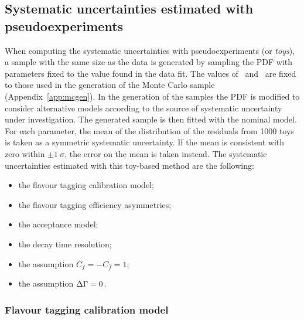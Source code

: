 \subsection{Systematic uncertainties estimated with pseudoexperiments}
\label{sec:systFromToys}

When computing the systematic uncertainties with pseudoexperiments (or \emph{toys}), a sample with the same size as the data is generated by sampling the PDF
with parameters fixed to the value found in the data fit. The values of \Sf~and \Sfb~are fixed
to those used in the generation of the Monte Carlo sample (Appendix~\ref{app:mcgen}).
In the generation of the samples
the PDF is modified to consider alternative models according to the source of systematic
uncertainty under investigation.
The generated sample is then fitted with the nominal model. For each parameter, the
mean of the distribution of the residuals from 1000 toys is taken
as a symmetric systematic uncertainty. If the mean is consistent with zero within $\pm 1~\sigma$,
the error on the mean is taken instead.
The systematic uncertainties estimated with this toy-based method are the following:
\begin{itemize}[noitemsep,topsep=0pt]
\item the flavour tagging calibration model;
\item the flavour tagging efficiency asymmetries;
\item the acceptance model;
\item the decay time resolution;
\item the assumption $C_f=-C_{\bar f}=1$;
\item the assumption $\Delta\Gamma=0$.
\end{itemize}

\subsubsection{Flavour tagging calibration model}
\label{sec:syst_toys_calibmodel}

